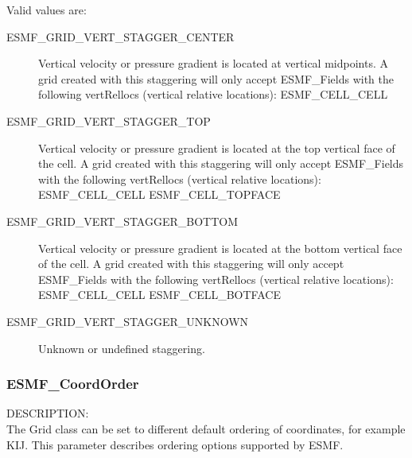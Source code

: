 Valid values are:
\begin{description}

   \item [ESMF\_GRID\_VERT\_STAGGER\_CENTER] 
         Vertical velocity or pressure gradient is located at vertical midpoints.
         A grid created with this staggering will only accept ESMF\_Fields with
         the following vertRellocs (vertical relative locations):
             ESMF\_CELL\_CELL

   \item [ESMF\_GRID\_VERT\_STAGGER\_TOP]
         Vertical velocity or pressure gradient is located at the top vertical 
         face of the cell.  A grid created with this staggering will only accept
         ESMF\_Fields with the following vertRellocs (vertical relative
         locations):
             ESMF\_CELL\_CELL
             ESMF\_CELL\_TOPFACE

   \item [ESMF\_GRID\_VERT\_STAGGER\_BOTTOM]
         Vertical velocity or pressure gradient is located at the bottom vertical 
         face of the cell.  A grid created with this staggering will only accept
         ESMF\_Fields with the following vertRellocs (vertical relative
         locations):
             ESMF\_CELL\_CELL
             ESMF\_CELL\_BOTFACE

   \item [ESMF\_GRID\_VERT\_STAGGER\_UNKNOWN]
         Unknown or undefined staggering.

\end{description}

\subsubsection{ESMF\_CoordOrder}

{\sf DESCRIPTION:\\}
The Grid class can be set to different default ordering of coordinates, for
example KIJ.  This parameter describes ordering options supported by ESMF.

